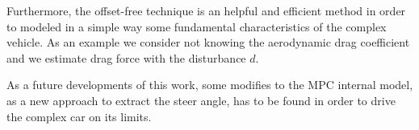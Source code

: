 \documentclass[conference]{IEEEtran} %
\begin{document}
Furthermore, the offset-free technique is an helpful and efficient method in order to modeled in a simple way some fundamental characteristics of the complex vehicle. As an example we consider not knowing the aerodynamic drag coefficient and we estimate drag force with the disturbance $d$.

As a future developments of this work, some modifies to the MPC internal model, as a new approach to extract the steer angle, has to be found in order to drive the complex car on its limits. 
\label{sec:conclusion}





\end{document}
